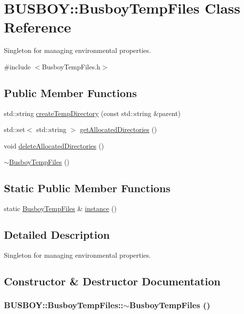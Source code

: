 \hypertarget{classBUSBOY_1_1BusboyTempFiles}{
\section{BUSBOY::BusboyTempFiles Class Reference}
\label{classBUSBOY_1_1BusboyTempFiles}
}


Singleton for managing environmental properties.  


{\ttfamily \#include $<$BusboyTempFiles.h$>$}\subsection*{Public Member Functions}
\begin{DoxyCompactItemize}
\item 
std::string \hyperlink{classBUSBOY_1_1BusboyTempFiles_a874ff804f268c8baba60a8ee8baed0e4}{createTempDirectory} (const std::string \&parent)
\item 
std::set$<$ std::string $>$ \hyperlink{classBUSBOY_1_1BusboyTempFiles_a990ce8348a48c0e8991dffdfd35d3cd0}{getAllocatedDirectories} ()
\item 
void \hyperlink{classBUSBOY_1_1BusboyTempFiles_ac103abf22657537c152286291e84c4e0}{deleteAllocatedDirectories} ()
\item 
\hyperlink{classBUSBOY_1_1BusboyTempFiles_a529f35130587d2897d401586701c2572}{$\sim$BusboyTempFiles} ()
\end{DoxyCompactItemize}
\subsection*{Static Public Member Functions}
\begin{DoxyCompactItemize}
\item 
static \hyperlink{classBUSBOY_1_1BusboyTempFiles}{BusboyTempFiles} \& \hyperlink{classBUSBOY_1_1BusboyTempFiles_a030dc3fce222b7aa0903c11f4850c4ea}{instance} ()
\end{DoxyCompactItemize}


\subsection{Detailed Description}
Singleton for managing environmental properties. 

\subsection{Constructor \& Destructor Documentation}
\hypertarget{classBUSBOY_1_1BusboyTempFiles_a529f35130587d2897d401586701c2572}{
\subsubsection[{$\sim$BusboyTempFiles}]{\setlength{\rightskip}{0pt plus 5cm}BUSBOY::BusboyTempFiles::$\sim$BusboyTempFiles ()}}
\label{classBUSBOY_1_1BusboyTempFiles_a529f35130587d2897d401586701c2572}



